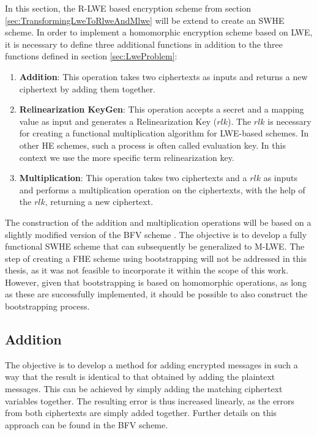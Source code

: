 In this section, the R-LWE based encryption scheme from section \ref{sec:TransformingLweToRlweAndMlwe} will be extend to create an SWHE scheme. In order to implement a homomorphic encryption scheme based on LWE, it is necessary to define three additional functions in addition to the three functions defined in section \ref{sec:LweProblem}:

\begin{enumerate}
  \item \textbf{Addition}: This operation takes two ciphertexts as inputs and returns a new ciphertext by adding them together.
  \item \textbf{Relinearization KeyGen}: This operation accepts a secret and a mapping value as input and generates a Relinearization Key ($rlk$). The $rlk$ is necessary for creating a functional multiplication algorithm for LWE-based schemes. In other HE schemes, such a process is often called evaluation key. In this context we use the more specific term relinearization key.
  \item \textbf{Multiplication}: This operation takes two ciphertexts and a $rlk$ as inputs and performs a multiplication operation on the ciphertexts, with the help of the $rlk$, returning a new ciphertext.
\end{enumerate}

The construction of the addition and multiplication operations will be based on a slightly modified version of the BFV scheme \cite{bfv}. The objective is to develop a fully functional SWHE scheme that can subsequently be generalized to M-LWE. The step of creating a FHE scheme using bootstrapping will not be addressed in this thesis, as it was not feasible to incorporate it within the scope of this work. However, given that bootstrapping is based on homomorphic operations, as long as these are successfully implemented, it should be possible to also construct the bootstrapping process.

\subsection*{Addition}

The objective is to develop a method for adding encrypted messages in such a way that the result is identical to that obtained by adding the plaintext messages. This can be achieved by simply adding the matching ciphertext variables together. The resulting error is thus increased linearly, as the errors from both ciphertexts are simply added together. Further details on this approach can be found in the BFV scheme.


